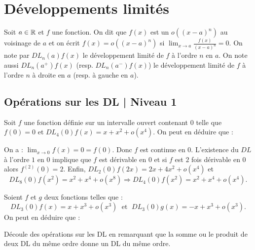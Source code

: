 
\section{Développements limités}
\noindent Soit $a\in \mathbb{R}$ et $f$ une fonction. On dit que $f(x)$ est un $o\left((x-a)^n\right)$ au voisinage de $a$ et on écrit $f(x)=o((x-a)^n)$ si $\displaystyle \lim _{x\to a}\frac{f(x)}{(x-a)^n}=0$. On note par $DL_n(a)f(x)$ le développement limité de $f$ à l'ordre $n$ en $a$. On note aussi $DL_n(a^+)f(x)$ (resp. $DL_n(a^-)f(x)$) le développement limité de $f$ à l'ordre $n$ à droite en $a$ (resp. à gauche en $a$).

\subsection{Opérations sur les DL | Niveau 1}

\begin{question}
Soit $f$ une fonction définie sur un intervalle ouvert contenant $0$ telle que $f(0)=0$ et $DL_4(0)f(x)=x+x^2+o(x^4)$. On peut en déduire que :
\begin{answers}  
\end{answers}
\begin{explanations}
On a : $\displaystyle \lim _{x\to 0}f(x)=0=f(0)$. Donc $f$ est continue en $0$. L'existence du $DL$ à l'ordre $1$ en $0$ implique que $f$ est dérivable en $0$ et si $f$ est $2$ fois dérivable en $0$ alors $f^{(2)}(0)=2$. Enfin, $DL_2(0)f(2x)=2x+4x^2+o(x^4)$ et 
$$DL_8(0)f(x^2)=x^2+x^4+o(x^8)\Rightarrow DL_4(0)f(x^2)=x^2+x^4+o(x^4).$$
\end{explanations}
\end{question}

\begin{question}
Soient $f$ et $g$ deux fonctions telles que : 
$$DL_3(0)f(x)=x+x^3+o(x^3)\; \mbox{ et }\; DL_3(0)g(x)=-x+x^3+o(x^3).$$
On peut en déduire que :
\begin{answers}  
\end{answers}
\begin{explanations}
Découle des opérations sur les DL en remarquant que la somme ou le produit de deux DL du même ordre donne un DL du même ordre.
\end{explanations}
\end{question}

